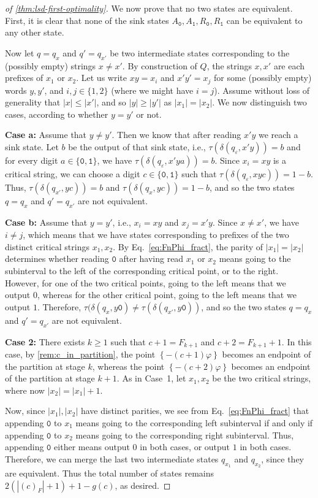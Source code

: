 \documentclass[12pt,runningheads]{llncs}
\newcommand{\tO}{\mathtt{0}}
\newcommand{\tL}{\mathtt{1}}
\renewcommand{\phi}{\varphi}
\newcommand{\eps}{\varepsilon}
\newcommand{\fract}[1]{\left\{ #1 \right\}}
\newcommand{\caseI}[1]{\medskip\noindent\textbf{Case #1:}}
\newcommand{\caseII}[1]{\textbf{Case #1:}}
\begin{document}
\begin{proof}[of \cref{thm:lsd-first-optimality}]
We now prove that no two states are equivalent. First, it is clear that none of the sink states $A_{\tO},A_{\tL}, R_{\tO},R_{\tL}$ can be equivalent to any other state. 

Now let $q = q_x$ and $q' = q_{x'}$ be two intermediate states corresponding to the (possibly empty) strings $x \neq x'$. By construction of $Q$, the strings $x, x'$ are each prefixes of $x_1$ or $x_2$. 
Let us write $x y = x_i$ and $x'y' = x_j$ for some (possibly empty) words $y,y'$, and $i,j \in \{1,2\}$ (where we might have $i=j$).
Assume without loss of generality that $|x|\leq |x'|$, and so $|y|\geq |y'|$ as $|x_1|=|x_2|$. We now distinguish two cases, according to whether $y=y'$ or not. 

\caseII{a} Assume that $y \neq y'$. Then we know that after reading $x' y$ we reach a sink state. Let $b$ be the output of that sink state, i.e., $\tau(\delta(q_\eps, x'y)) = b$ and for every digit $a\in \{\tO,\tL\}$, we have $\tau(\delta(q_\eps, x'ya)) = b$.
Since $x_i=xy$ is a critical string, we can choose a digit $c \in \{\tO,\tL\}$ such that $\tau(\delta(q_\eps, xyc)) = 1- b$. Thus, $\tau(\delta(q_{x'},yc)) = b$ and $ \tau(\delta(q_{x},yc))=1-b$, and so the two states  $q = q_x$ and $q' = q_{x'}$ are not equivalent.


\caseII{b} Assume that $y = y'$, i.e., $x_i = xy$ and $x_j = x'y$. Since $x\neq x'$, we have $i\neq j$, which means that we have states corresponding to prefixes of the two distinct critical strings $x_1,x_2$. 
By Eq.~\eqref{eq:FnPhi_fract}, the parity of $|x_1|= |x_2|$ determines whether reading $\tO$ after having read $x_1$ or $x_2$ means going to the subinterval to the left of the corresponding critical point, or to the right. 
However, for one of the two critical points, going to the left means that we output $0$, whereas for the other critical point, going to the left means that we output $1$. Therefore, $\tau(\delta(q_x,y\tO) \neq \tau(\delta(q_{x'},y\tO))$, and so the two states $q = q_x$ and $q' = q_{x'}$ are not equivalent. 

\caseI{2} There exists $k\geq 1$ such that $c+1 = F_{k+1}$ and $c+2 = F_{k+1} + 1$. In this case, by \cref{rem:c_in_partition}, the point $\fract{-(c+1)\phi}$ becomes an endpoint of the partition at stage $k$, whereas the point $\fract{-(c+2)\phi}$ becomes an endpoint of the partition at stage $k+1$. As in Case~1, let $x_1, x_2$ be the two critical strings, where now $|x_2| = |x_1|+1$.


Now, since $|x_1|,|x_2|$ have distinct parities, we see from Eq.~\eqref{eq:FnPhi_fract} that appending $\tO$ to $x_1$ means going to the corresponding left subinterval if and only if appending $\tO$ to $x_2$ means going to the corresponding right subinterval. Thus, appending $\tO$ either means output $0$ in both cases, or output $1$ in both cases.
Therefore, we can merge the last two intermediate states $q_{x_1}$ and $q_{x_2}$, since they are equivalent. 
Thus the total number of states remains $2(|(c)_F|+1)+1-g(c)$, as desired. 


\end{proof}
\end{document}
